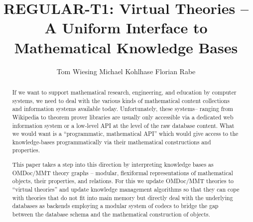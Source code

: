 \documentclass{llncs}
\title{REGULAR-T1: Virtual Theories -- A Uniform Interface to Mathematical Knowledge Bases}
\author{
Tom Wiesing\inst{1}
Michael Kohlhase\inst{1} 
Florian Rabe\inst{2} 
}
\institute{
   FAU Erlangen-N\"urnberg
   \and Jacobs University Bremen
}
\providecommand{\ommt}{\textsf{OMDoc}/\textsf{MMT}\xspace}
\begin{document}
\maketitle
\begin{abstract}
  If we want to support mathematical research, engineering, and education by computer systems, we need to deal with the various kinds of mathematical content collections and information systems available today. Unfortunately, these systems-- ranging from Wikipedia to theorem prover libraries are usually only accessible via a dedicated web information system or a low-level API at the level of the raw database content.  What we would want is a ``programmatic, mathematical API'' which would give access to the knowledge-bases programmatically via their mathematical constructions and properties.

  This paper takes a step into this direction by interpreting knowledge bases as \ommt theory graphs -- modular, flexiformal representations of mathematical objects, their properties, and relations. 
  For this we update \ommt theories to ``virtual theories'' and update knowledge management algorithms so that they can cope with theories that do not fit into main memory but directly deal with the underlying databases as backends employing a modular system of codecs to bridge the gap between the database schema and the mathematical construction of objects.
\end{abstract}





\printbibliography
\end{document}
